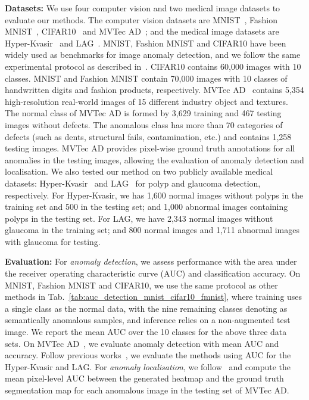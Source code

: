\documentclass[letterpaper]{article} \usepackage{aaai22}  \usepackage{times}  \usepackage{helvet}  \usepackage{courier}  \usepackage[hyphens]{url}  \usepackage{graphicx} \urlstyle{rm} \def\UrlFont{\rm}  \usepackage{natbib}  \usepackage{caption} \DeclareCaptionStyle{ruled}{labelfont=normalfont,labelsep=colon,strut=off} \frenchspacing  \setlength{\pdfpagewidth}{8.5in}  \setlength{\pdfpageheight}{11in}  \usepackage{algorithm}
\begin{document}
\textbf{Datasets:} We use four computer vision and two medical image datasets to evaluate our methods. The computer vision datasets are MNIST~\cite{lecun2010mnist}, Fashion MNIST~\cite{fmnist}, CIFAR10~\cite{krizhevsky2014cifar} and MVTec AD~\cite{mvtecad}; and the medical image datasets are Hyper-Kvasir~\cite{borgli2020hyperkvasir} and LAG~\cite{li2019attention}. MNIST, Fashion MNIST and CIFAR10 have been widely used as benchmarks for image anomaly detection, and we follow the same experimental protocol as described in~\cite{dsvdd}. 
CIFAR10 contains 60,000 images with 10 classes. MNIST and Fashion MNIST contain 70,000 images with 10 classes of handwritten digits and fashion products, respectively. 
MVTec AD~\cite{mvtecad} contains 5,354 high-resolution real-world images of 15 different industry object and textures. The normal class of MVTec AD is formed by 3,629 training and 467 testing images without defects. The anomalous class has more than 70 categories of defects (such as dents, structural fails, contamination, etc.) and contains 1,258 testing images. MVTec AD provides pixel-wise ground truth annotations for all anomalies in the testing images, allowing the evaluation of anomaly detection and localisation. 
We also tested our method on two publicly available medical datasets: Hyper-Kvasir~\cite{borgli2020hyperkvasir} and LAG~\cite{li2019attention} for polyp and glaucoma detection, respectively. For Hyper-Kvasir, we has 1,600 normal images without polyps in the training set and 500 in the testing set; and 1,000 abnormal images containing polyps in the testing set. For LAG, we have 2,343 normal images without glaucoma in the training set; and 800 normal images and 1,711 abnormal images with glaucoma for testing. 






\textbf{Evaluation:} For \emph{anomaly detection}, we assess performance with the area under the receiver operating characteristic curve (AUC) and classification accuracy. On MNIST, Fashion MNIST and CIFAR10, we use the same protocol as other methods in Tab.~\ref{tab:auc_detection_mnist_cifar10_fmnist}, where training uses a single class as the normal data, with the nine remaining classes denoting as semantically anomalous samples, and inference relies on a non-augmented test image. 
We report the mean AUC over the 10 classes for the above three data sets. On MVTec AD~\cite{bergmann2020uninformed,venkataramanan2019attention}, we evaluate anomaly detection with mean AUC and accuracy. Follow previous works~\cite{tian2021constrained,tian2021selfsupervised}, we evaluate the methods using AUC for the Hyper-Kvasir and LAG. 
For \emph{anomaly localisation}, we follow~\cite{venkataramanan2019attention} and compute the mean pixel-level AUC between the generated heatmap and the ground truth segmentation map for each anomalous image in the testing set of MVTec AD.
\end{document}
